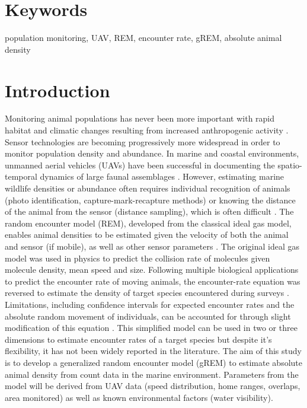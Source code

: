 \documentclass[11pt]{article}
\begin{document}
\section{Keywords}
population monitoring, UAV, REM, encounter rate, gREM, absolute animal density

\section{Introduction}
Monitoring animal populations has never been more important with rapid habitat and climatic changes resulting from increased anthropogenic activity \cite{IPCC2018}. Sensor technologies are becoming progressively more widespread in order to monitor population density and abundance. In marine and coastal environments, unmanned aerial vehicles (UAVs) have been successful in documenting the spatio-temporal dynamics of large faunal assemblages \cite{colefax2019reliability}. However, estimating marine wildlife densities or abundance often requires individual recognition of animals (photo identification, capture-mark-recapture methods) or knowing the distance of the animal from the sensor (distance sampling), which is often difficult \cite{Lucas}. The random encounter model (REM), developed from the classical ideal gas model, enables animal densities to be estimated given the velocity of both the animal and sensor (if mobile), as well as other sensor parameters \cite{rowcliffe}. The original ideal gas model was used in physics to predict the collision rate of molecules given molecule density, mean speed and size. Following multiple biological applications to predict the encounter rate of moving animals, the encounter-rate equation was reversed to estimate the density of target species encountered during surveys \cite{yapp1956theory}. Limitations, including confidence intervals for expected encounter rates and the absolute random movement of individuals, can be accounted for through slight modification of this equation \cite{hutchinson2007use}. This simplified model can be used in two or three dimensions to estimate encounter rates of a target species but despite it's flexibility, it has not been widely reported in the literature. The aim of this study is to develop a generalized random encounter model (gREM) to estimate absolute animal density from count data in the marine environment. Parameters from the model will be derived from UAV data (speed distribution, home ranges, overlaps, area monitored) as well as known environmental factors (water visibility).  
\end{document}
